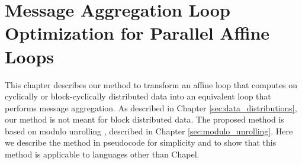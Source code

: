 
\renewcommand{\thechapter}{6}

\chapter{Message Aggregation Loop Optimization for Parallel Affine Loops}\label{sec:transformation} 


This chapter describes our method to transform an affine loop that computes on cyclically or block-cyclically distributed data into an equivalent loop that performs message aggregation. As described in Chapter \ref{sec:data_distributions}, our method is not meant for block distributed data. The proposed method is based on modulo unrolling \cite{barua1999maps}, described in Chapter \ref{sec:modulo_unrolling}. Here we describe the method in pseudocode for simplicity and to show that this method is applicable to languages other than Chapel. 

